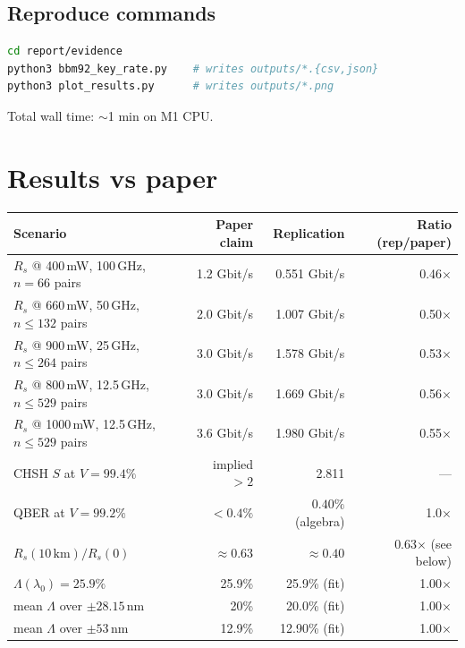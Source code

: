 \documentclass[11pt]{article}
\begin{document}
\subsection{Reproduce commands}
\begin{lstlisting}[language=bash]
cd report/evidence
python3 bbm92_key_rate.py    # writes outputs/*.{csv,json}
python3 plot_results.py      # writes outputs/*.png
\end{lstlisting}
Total wall time: $\sim$1 min on M1 CPU.

\section{Results vs paper}
\begin{tabular}{@{}p{}rrr@{}}
\toprule
Scenario & Paper claim & Replication & Ratio (rep/paper) \\
\midrule
$R_s$ @ 400\,mW, 100\,GHz, $n{=}66$ pairs                    & 1.2 Gbit/s  & 0.551 Gbit/s & 0.46$\times$ \\
$R_s$ @ 660\,mW, 50\,GHz,  $n{\leq}132$ pairs                & 2.0 Gbit/s  & 1.007 Gbit/s & 0.50$\times$ \\
$R_s$ @ 900\,mW, 25\,GHz,  $n{\leq}264$ pairs                & 3.0 Gbit/s  & 1.578 Gbit/s & 0.53$\times$ \\
$R_s$ @ 800\,mW, 12.5\,GHz, $n{\leq}529$ pairs               & 3.0 Gbit/s  & 1.669 Gbit/s & 0.56$\times$ \\
$R_s$ @ 1000\,mW, 12.5\,GHz, $n{\leq}529$ pairs              & 3.6 Gbit/s  & 1.980 Gbit/s & 0.55$\times$ \\
CHSH $S$ at $V=99.4\%$                                       & implied ${>}2$ & 2.811 & --- \\
QBER at $V=99.2\%$                                           & ${<}0.4\%$  & $0.40\%$ (algebra) & 1.0$\times$ \\
$R_s(10\,\mathrm{km})/R_s(0)$                                & $\approx0.63$ & $\approx0.40$ & 0.63$\times$ (see below) \\
$\Lambda(\lambda_{0}){=}25.9\%$                              & 25.9\%      & 25.9\% (fit) & 1.00$\times$ \\
mean $\Lambda$ over $\pm 28.15$\,nm                          & 20\%        & 20.0\% (fit) & 1.00$\times$ \\
mean $\Lambda$ over $\pm 53$\,nm                             & 12.9\%      & 12.90\% (fit) & 1.00$\times$ \\
\bottomrule
\end{tabular}
\end{document}
